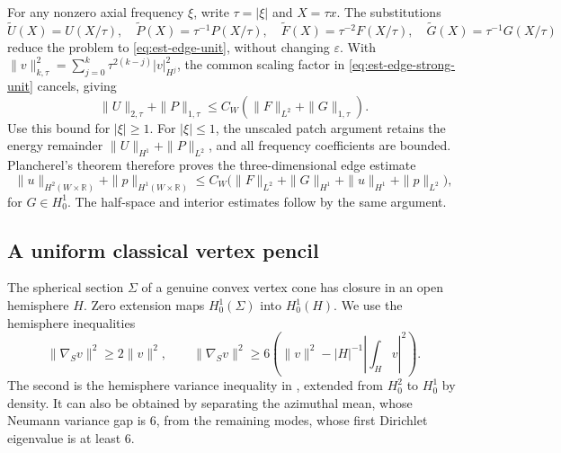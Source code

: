 \documentclass[11pt,a4paper]{article}
\theoremstyle{remark}
\numberwithin{equation}{section}
\begin{document}
For any nonzero axial frequency $\xi$, write $\tau=|\xi|$ and $X=\tau x$.
The substitutions
\[
 \widetilde U(X)=U(X/\tau),\quad
 \widetilde P(X)=\tau^{-1}P(X/\tau),\quad
 \widetilde F(X)=\tau^{-2}F(X/\tau),\quad
 \widetilde G(X)=\tau^{-1}G(X/\tau)
\]
reduce the problem to \eqref{eq:est-edge-unit}, without changing
$\varepsilon$. With
$\|v\|_{k,\tau}^2=\sum_{j=0}^k\tau^{2(k-j)}|v|_{H^j}^2$,
the common scaling factor in \eqref{eq:est-edge-strong-unit} cancels,
giving
\[
 \|U\|_{2,\tau}+\|P\|_{1,\tau}
 \le C_W(\|F\|_{L^2}+\|G\|_{1,\tau}).
\]
Use this bound for $|\xi|\ge1$. For $|\xi|\le1$, the unscaled patch
argument retains the energy remainder
$\|U\|_{H^1}+\|P\|_{L^2}$, and all frequency coefficients are bounded.
Plancherel's theorem therefore proves the three-dimensional edge estimate
\begin{equation}\label{eq:est-classical-edge}
 \|u\|_{H^2(W\times\mathbb R)}+\|p\|_{H^1(W\times\mathbb R)}
 \le C_W\bigl(\|F\|_{L^2}+\|G\|_{H^1}
                   +\|u\|_{H^1}+\|p\|_{L^2}\bigr),
\end{equation}
for $G\in H_0^1$. The half-space and interior estimates follow by the
same argument.

\subsection{A uniform classical vertex pencil}

The spherical section $\Sigma$ of a genuine convex vertex cone has closure
in an open hemisphere $H$. Zero extension maps $H_0^1(\Sigma)$ into
$H_0^1(H)$. We use the hemisphere inequalities
\begin{equation}\label{eq:est-hemisphere}
 \|\nabla_Sv\|^2\ge2\|v\|^2,
 \qquad
 \|\nabla_Sv\|^2\ge6\left(\|v\|^2-
                 |H|^{-1}\left|\int_Hv\right|^2\right).
\end{equation}
The second is the hemisphere variance inequality in
\cite[Lemma 2.3, equation (2.25)]{MayborodaMazya2008}, extended from
$H_0^2$ to $H_0^1$ by density. It can also be obtained by separating the
azimuthal mean, whose Neumann variance gap is $6$, from the remaining
modes, whose first Dirichlet eigenvalue is at least $6$.
\end{document}
